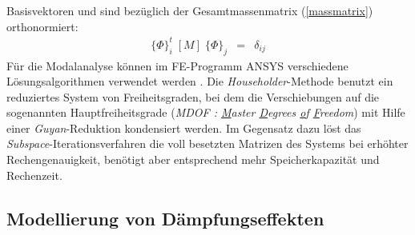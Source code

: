 Basisvektoren und sind bezüglich der Gesamtmassenmatrix (\ref{massmatrix})
orthonormiert:
\begin{eqnarray}
\label{ons}
 \{ \Phi \}^{t}_{i} \; [M] \; \{ \Phi \}_{j} & = & \delta_{ij}
\end{eqnarray}
Für die Modalanalyse können im FE-Programm {\sf ANSYS} verschiedene
Lösungsalgorithmen verwendet werden \cite{Koh92}.
Die {\sl Householder}-Methode
benutzt ein reduziertes System von Freiheitsgraden, bei dem die
Verschiebungen auf die sogenannten Hauptfreiheitsgrade
({\em MDOF : \underline{M}aster \underline{D}egrees \underline{o}f
\underline{F}reedom}) mit Hilfe einer {\sl Guyan}-Reduktion kondensiert
werden. Im Gegensatz dazu löst das
{\em Subspace}-Iterationsverfahren die voll besetzten Matrizen
des Systems bei erhöhter Rechengenauigkeit, benötigt aber entsprechend
mehr Speicherkapazität und Rechenzeit.


\subsection{Modellierung von Dämpfungseffekten}
\label{daempfungseffekte}


